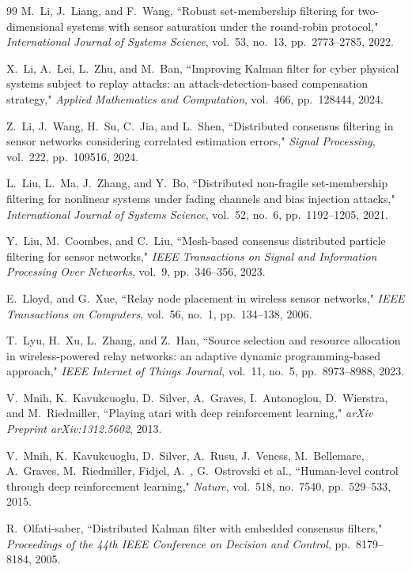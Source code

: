 \documentclass[twocolumn]{IEEEtran}
\begin{document}
\begin{thebibliography}{99}
M.~Li, J.~Liang, and F.~Wang, ``Robust set-membership filtering for two-dimensional systems with sensor saturation under the round-robin protocol," \textit{International Journal of Systems Science}, vol.~53, no.~13, pp.~2773--2785, 2022.

X.~Li, A.~Lei, L.~Zhu, and M.~Ban, ``Improving Kalman filter for cyber physical systems subject to replay attacks: an attack-detection-based compensation strategy," \textit{Applied Mathematics and Computation}, vol.~466, pp.~128444, 2024.

Z.~Li, J.~Wang, H.~Su, C.~Jia, and L.~Shen, ``Distributed consensus filtering in sensor networks considering correlated estimation errors," \textit{Signal Processing}, vol.~222, pp.~109516, 2024.

L.~Liu, L.~Ma, J.~Zhang, and Y.~Bo, ``Distributed non-fragile set-membership filtering for nonlinear systems under fading channels and bias injection attacks," \textit{International Journal of Systems Science}, vol.~52, no.~6, pp.~1192--1205, 2021.

Y.~Liu, M.~Coombes, and C.~Liu, ``Mesh-based consensus distributed particle filtering for sensor networks," \textit{IEEE Transactions on Signal and Information Processing Over Networks}, vol.~9, pp.~346--356, 2023.

E.~Lloyd, and G.~Xue, ``Relay node placement in wireless sensor networks," \textit{IEEE Transactions on Computers}, vol.~56, no.~1, pp.~134--138, 2006.

T.~Lyu, H.~Xu, L.~Zhang, and Z.~Han, ``Source selection and resource allocation in wireless-powered relay networks: an adaptive dynamic programming-based approach," \textit{IEEE Internet of Things Journal}, vol.~11, no.~5, pp.~8973--8988, 2023.

V.~Mnih, K.~Kavukcuoglu, D.~Silver, A.~Graves, I.~Antonoglou, D.~Wierstra, and M.~Riedmiller, ``Playing atari with deep reinforcement learning," \textit{arXiv Preprint arXiv:1312.5602}, 2013.

V.~Mnih, K.~Kavukcuoglu, D.~Silver, A.~Rusu, J.~Veness, M.~Bellemare, A.~Graves, M.~Riedmiller, Fidjel, A.~, G.~Ostrovski et al., ``Human-level control through deep reinforcement learning," \textit{Nature}, vol.~518, no.~7540, pp.~529--533, 2015.

R.~Olfati-saber, ``Distributed Kalman filter with embedded consensus filters," \textit{Proceedings of the 44th IEEE Conference on Decision and Control}, pp.~8179--8184, 2005.


\end{thebibliography}
\end{document}
